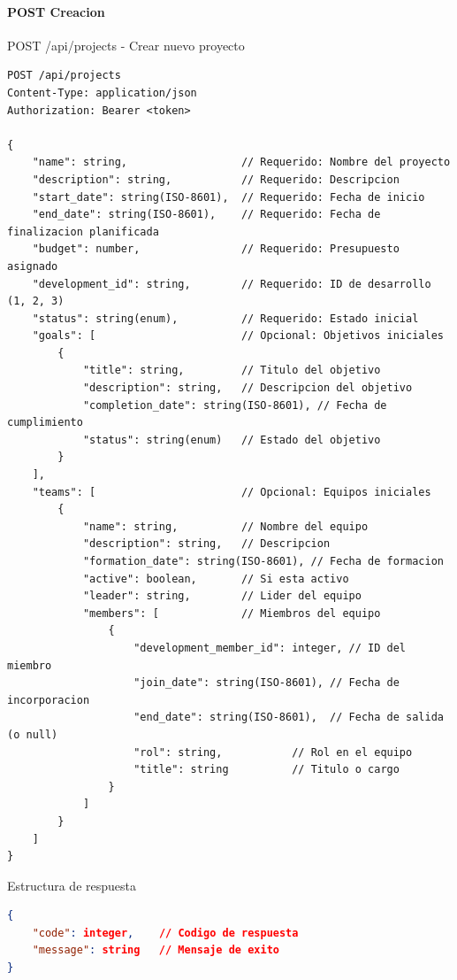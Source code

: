 \documentclass[11pt,a4paper]{article}
\begin{document}
\paragraph{POST Creacion}
\begin{center}
	\begin{minipage}{\textwidth}
		\begin{codebox}{POST /api/projects - Crear nuevo proyecto}
			\begin{lstlisting}[language=HTTP]
POST /api/projects
Content-Type: application/json
Authorization: Bearer <token>

{
    "name": string,                  // Requerido: Nombre del proyecto
    "description": string,           // Requerido: Descripcion
    "start_date": string(ISO-8601),  // Requerido: Fecha de inicio
    "end_date": string(ISO-8601),    // Requerido: Fecha de finalizacion planificada
    "budget": number,                // Requerido: Presupuesto asignado
    "development_id": string,        // Requerido: ID de desarrollo (1, 2, 3)
    "status": string(enum),          // Requerido: Estado inicial
    "goals": [                       // Opcional: Objetivos iniciales
        {
            "title": string,         // Titulo del objetivo
            "description": string,   // Descripcion del objetivo
            "completion_date": string(ISO-8601), // Fecha de cumplimiento
            "status": string(enum)   // Estado del objetivo
        }
    ],
    "teams": [                       // Opcional: Equipos iniciales
        {
            "name": string,          // Nombre del equipo
            "description": string,   // Descripcion
            "formation_date": string(ISO-8601), // Fecha de formacion
            "active": boolean,       // Si esta activo
            "leader": string,        // Lider del equipo
            "members": [             // Miembros del equipo
                {
                    "development_member_id": integer, // ID del miembro
                    "join_date": string(ISO-8601), // Fecha de incorporacion
                    "end_date": string(ISO-8601),  // Fecha de salida (o null)
                    "rol": string,           // Rol en el equipo
                    "title": string          // Titulo o cargo
                }
            ]
        }
    ]
}
\end{lstlisting}
		\end{codebox}
	\end{minipage}
\end{center}

\begin{center}
	\begin{minipage}{\textwidth}
		\begin{codebox}{Estructura de respuesta}
			\begin{lstlisting}[language=json]
{
    "code": integer,    // Codigo de respuesta
    "message": string   // Mensaje de exito
}
\end{lstlisting}
		\end{codebox}
	\end{minipage}
\end{center}
\end{document}
